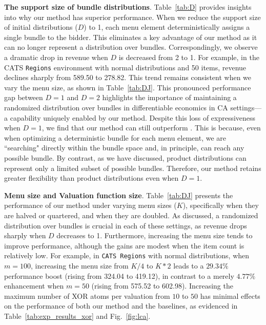 \textbf{The support size of bundle distributions}. Table~\ref{tab:D} provides insights into why our method has superior performance. When we reduce the support size of initial distributions ($D$) to 1, each menu element deterministically assigns a single bundle to the bidder. This eliminates a key advantage of our method as it can no longer represent a distribution over bundles. Correspondingly, we observe a dramatic drop in revenue when $D$ is decreased from 2 to 1. For example, in the CATS \texttt{Regions} environment with normal distributions and 50 items, revenue declines sharply from 589.50 to 278.82. This trend remains consistent when we vary the menu size, as shown in Table~\ref{tab:DJ}. This pronounced performance gap between $D=1$ and $D=2$ highlights the importance of maintaining a randomized distribution over bundles in differentiable economics in CA settings---a capability uniquely enabled by our method.
%
Despite this loss of expressiveness when $D=1$, we find that our method can still outperform \bundle. This is because, even when optimizing a deterministic bundle for each menu element, we are ``searching" directly within the bundle space and, in principle, can reach any possible bundle. By contrast, as we have discussed, product distributions can represent only a limited subset of possible bundles. Therefore, our method retains greater flexibility than product distributions even when $D=1$.

\textbf{Menu size and Valuation function size}. Table~\ref{tab:DJ} presents the performance of our method under varying menu sizes ($K$), specifically when they are halved or quartered, and when they are doubled. As discussed, a randomized distribution over bundles is crucial in each of these settings, as revenue drops sharply when $D$ decreases to 1. Furthermore, increasing the menu size tends to improve performance, although the gains are modest when the item count is relatively low. For example, in \texttt{CATS Regions} with normal distributions, when $m=100$, increasing the menu size from $K/4$ to $K*2$ leads to a $29.34\%$ performance boost (rising from 324.04 to 419.12), in contrast to a merely $4.77\%$ enhancement when $m=50$ (rising from 575.52 to 602.98). Increasing the maximum number of XOR atoms per valuation from $10$ to $50$ has minimal effects on the performance of both our method and the baselines, as evidenced in Table~\ref{tab:exp_results_xor} and Fig.~\ref{fig:lca}.


